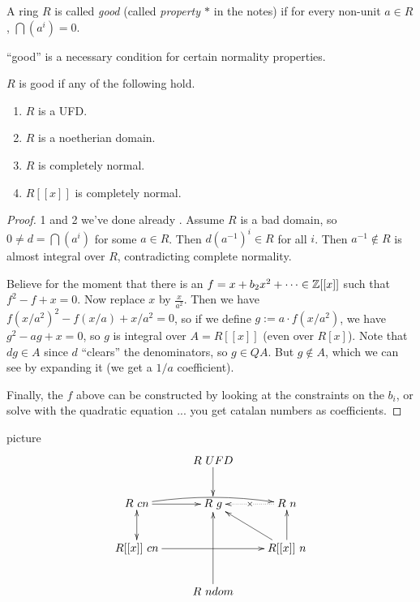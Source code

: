  \setcounter{lecture}{28}

 \begin{definition}
   A ring $R$ is called \emph{good} (called \emph{property $\ast$} in the notes) if for
   every non-unit $a\in R$, $\bigcap (a^i)=0$.
 \end{definition}
 ``good'' is a necessary condition for certain normality properties.
 \begin{proposition}
   $R$ is good if any of the following hold.
   \begin{enumerate}
     \item $R$ is a UFD.
     \item $R$ is a noetherian domain.
     \item $R$ is completely normal.
     \item $R[[x]]$ is completely normal.
   \end{enumerate}
 \end{proposition}
 \begin{proof}
   1 and 2 we've done already \anton{}. Assume $R$ is a bad domain, so $0\neq d=\bigcap
   (a^i)$ for some $a\in R$. Then $d(a^{-1})^i\in R$ for all $i$. Then $a^{-1}\not\in R$
   is almost integral over $R$, contradicting complete normality.

   Believe for the moment that there is an $f=x+b_2x^2+\cdots \in \mathbb{Z}[[x]]$ such that
   $f^2-f+x=0$. Now replace $x$ by $\frac{x}{a^2}$. Then we have
   $f(x/a^2)^2-f(x/a)+x/a^2=0$, so if we define $g:= a\cdot f(x/a^2)$, we have
   $g^2-ag+x=0$, so $g$ is integral over $A=R[[x]]$ (even over $R[x]$). Note that $dg\in
   A$ since $d$ ``clears'' the denominators, so $g\in Q{A}$. But $g\not\in A$, which we
   can see by expanding it (we get a $1/a$ coefficient).

   Finally, the $f$ above can be constructed by looking at the constraints on the $b_i$,
   or solve with the quadratic equation ... you get catalan numbers as coefficients.
 \end{proof}

 picture
 \[\xymatrix{
  &R\ UFD \ar[d]\\
  R\ cn\ar[r] \ar@/^/[rr] & R\ g & R\ n \ar@{.>}[l]|{\times}\\
  R[[x]]\ cn \ar@{<->}[u] \ar[rr] &  & R[[x]]\ n \ar[lu] \ar[u]\\
   & R\ ndom \ar[uu]
 }\]

